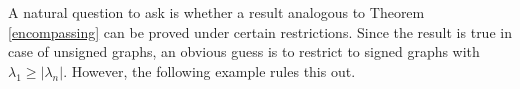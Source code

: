 \documentclass[12pt]{article}
\theoremstyle{plain}
\numberwithin{equation}{section}
\DeclareMathOperator{\spec}{spec}
\begin{document}
			
	A natural question to ask is whether a result analogous to Theorem \ref{encompassing} can be proved under certain restrictions. Since the result is true in case of unsigned graphs, an obvious guess is to restrict to signed graphs with $\lambda_1 \geq \vert \lambda_n \vert$. However, the following example rules this out.
	
\end{document}
